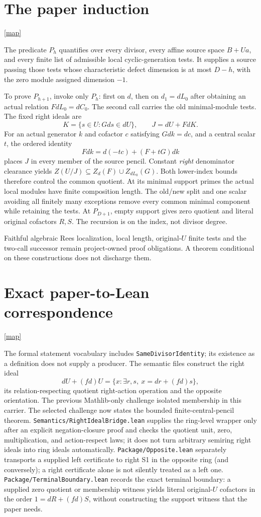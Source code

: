 \documentclass[10pt,a4paper]{article}
\newcommand{\backmap}{\hfill\hyperlink{proofmap}{[map]}}
\newcommand{\lean}[1]{\nolinkurl{#1}}
\begin{document}
\section{The paper induction}\label{sec:architecture}\backmap

The predicate \(P_h\) quantifies over every divisor, every affine source
space \(B+Ua\), and every finite list of admissible local cyclic-generation
tests. It supplies a source passing those tests whose characteristic defect
dimension is at most \(D-h\), with the zero module assigned dimension \(-1\).

To prove \(P_{h+1}\), invoke only \(P_h\): first on \(d\), then on
\(d_1=dL_0\) after obtaining an actual relation \(FdL_0=dC_0\). The second
call carries the old minimal-module tests. The fixed right ideals are
\[
 K=\{s\in U:Gds\in dU\},\qquad J=dU+FdK.
\]
For an actual generator \(k\) and cofactor \(c\) satisfying \(Gdk=dc\), and
a central scalar \(t\), the ordered identity
\[
 Fdk=d(-tc)+(F+tG)dk
\]
places \(J\) in every member of the source pencil. Constant \emph{right}
denominator clearance yields
\(Z(U/J)\subseteq Z_d(F)\cup Z_{dL_0}(G)\).
Both lower-index bounds therefore control the common quotient. At its
minimal support primes the actual local modules have finite composition
length. The old/new split and one scalar avoiding all finitely many
exceptions remove every common minimal component while retaining the tests.
At \(P_{D+1}\), empty support gives zero quotient and literal original
cofactors \(R,S\). The recursion is on the index, not divisor degree.

Faithful algebraic Rees localization, local length, original-\(U\) finite
tests and the two-call successor remain project-owned proof obligations.
A theorem conditional on these constructions does not discharge them.

\section{Exact paper-to-Lean correspondence}\label{sec:comparison}\backmap

The formal statement vocabulary includes \lean{SameDivisorIdentity}; its
existence as a definition does not supply a producer. The semantic files
construct the right ideal
\[
 dU+(fd)U=\{x:\exists r,s,\ x=dr+(fd)s\},
\]
its relation-respecting quotient right-action operation and the opposite orientation. The previous Mathlib-only challenge isolated membership in this carrier.
The selected challenge now states the bounded finite-central-pencil theorem.
\lean{Semantics/RightIdealBridge.lean} supplies the ring-level wrapper only
after an explicit negation-closure proof and checks the quotient unit, zero,
multiplication, and action-respect laws; it does not turn arbitrary semiring
right ideals into ring ideals automatically.
\lean{Package/Opposite.lean} separately transports a supplied left certificate
to right S1 in the opposite ring (and conversely); a right certificate alone is
not silently treated as a left one.  \lean{Package/TerminalBoundary.lean}
records the exact terminal boundary: a supplied zero quotient or membership
witness yields literal original-\(U\) cofactors in the order
\(1=dR+(fd)S\), without constructing the support witness that the paper
needs.
\end{document}
